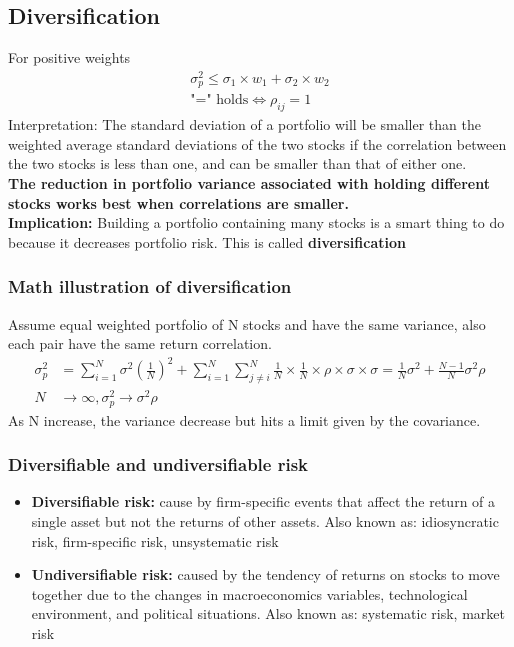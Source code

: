 \documentclass{article}
\theoremstyle{definition}
\theoremstyle{thrm}
\theoremstyle{lma}
\theoremstyle{ppst}
\theoremstyle{crlr}
\begin{document}
\subsection{Diversification}
For positive weights
\begin{align*}
	\sigma_p^2\leq \sigma_1\times w_1+\sigma_2\times w_2\\
	\text{"=" holds} \iff \rho_{ij}=1
\end{align*}
Interpretation: The standard deviation of a portfolio will be smaller than the weighted average standard deviations of the two stocks if the correlation between the two stocks is less than one, and can be smaller than that of either one. \\
\textbf{The reduction in portfolio variance associated with holding different stocks works best when correlations are smaller.}\\
\textbf{Implication: } Building a portfolio containing many stocks is a smart thing to do because it decreases portfolio risk. This is called \textbf{diversification}
\subsubsection{Math illustration of diversification}
Assume equal weighted portfolio of N stocks and have the same variance, also each pair have the same return correlation. 
\begin{align*}
	\sigma_p^2 &= \sum_{i=1}^N\sigma^2(\frac{1}{N})^2+ \sum_{i=1}^N\sum_{j\neq i}^N \frac{1}{N}\times \frac{1}{N} \times \rho\times \sigma\times \sigma = \frac{1}{N}\sigma^2+\frac{N-1}{N}\sigma^2\rho\\
	N &\to \infty, \sigma_p^2\to \sigma^2\rho
\end{align*}
As N increase, the variance decrease but hits a limit given by the covariance. 
\subsubsection{Diversifiable and undiversifiable risk}
\begin{itemize}
	\item \textbf{Diversifiable risk:} cause by firm-specific events that affect the return of a single asset but not the returns of other assets. Also known as: idiosyncratic risk, firm-specific risk, unsystematic risk
	\item \textbf{Undiversifiable risk: } caused by the tendency of returns on stocks to move together due to the changes in macroeconomics variables, technological environment, and political situations. Also known as: systematic risk, market risk
\end{itemize}
\end{document}
